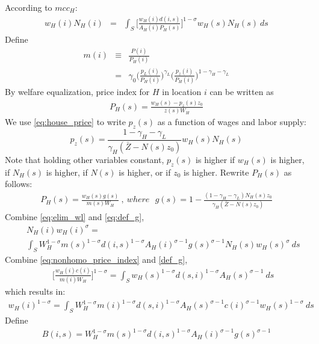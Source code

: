 \documentclass{article}
\begin{document}
According to $mcc_H$:
\begin{eqnarray}
    \label{eq:elim_wl}
	w_H(i) N_H(i) & = & \int_S \Big[ \frac{w_H(i) d(i,s)}{A_H(i) P_H(s)} \Big]^{1-\sigma} w_H(s) N_H(s) ~ds
\end{eqnarray}
Define
\begin{eqnarray}
    \label{eq:def_m}
	m(i)  & \equiv & \frac{P(i)}{P_H(i)} \nonumber \\ & = & 
	\gamma_{0}
	\Big( \frac{p_L(i)}{P_H(i)} \Big)^{\gamma_L}
	\Big( \frac{p_z(i)}{P_H(i)} \Big)^{1-\gamma_H-\gamma_L}
\end{eqnarray}
By welfare equalization, price index for $H$ in location $i$ can be written as
\begin{eqnarray}
	P_H(s) = \frac{w_H(s) -p_z(s)z_0}{z(s) W_H } \nonumber
\end{eqnarray}
We use \eqref{eq:house_price} to write $p_z(s)$ as a function of wages and labor supply: 
\[
	p_z(s) = \frac{1-\gamma_H -\gamma_L}{\gamma_H (\bar{Z}-N(s)z_0)}w_H(s)N_H(s)
\]
Note that holding other variables constant, $p_z(s)$ is higher if $w_H(s)$ is higher, if $N_H(s)$ is higher, if $N(s)$ is higher, or if $z_0$ is higher. Rewrite $P_H(s)$ as follows:
\begin{eqnarray}
	P_H(s) = \frac{w_H(s)g(s)}{m(s) W_H }	~,~where~~~
    \label{eq:def_g}
	g(s)=1- \frac{(1-\gamma_H -\gamma_L)N_H(s)z_0}{\gamma_H (\bar{Z}-N(s)z_0)} 
\end{eqnarray}
Combine \eqref{eq:elim_wl} and \eqref{eq:def_g},
\begin{eqnarray}
	& & N_H(i) w_H(i)^{\sigma}   = \nonumber \\
	& & \int_S W_H^{1-\sigma} m(s)^{1-\sigma} d(i,s)^{1-\sigma} A_H(i)^{\sigma-1} g(s)^{\sigma-1} N_H(s) w_H(s)^{\sigma}~ds  \nonumber
\end{eqnarray}
Combine \eqref{eq:nonhomo_price_index} and \eqref{def_g}, 
\begin{eqnarray}
    \label{eq:nonhomo_append_eq1}
	& & \Big[ \frac{w_H(i) c(i)}{m(i) W_H } \Big]^{1-\sigma} = \int_S w_H(s)^{1-\sigma}d(s,i)^{1-\sigma}A_H(s)^{\sigma-1}~ ds
\end{eqnarray}
which results in:
\begin{eqnarray}
    \label{eq:nonhomo_append_eq2}
 	w_H(i)^{1-\sigma} = \int_S W_H^{1-\sigma} m(i)^{1-\sigma} d(s,i)^{1-\sigma} A_H(s)^{\sigma-1} c(i)^{\sigma-1}  	w_H(s)^{1-\sigma}
 	~ ds
\end{eqnarray}
Define
\begin{eqnarray}
    \label{eq:def_B}
	B(i,s) = W_H^{1-\sigma} m(s)^{1-\sigma}  d(i,s)^{1-\sigma} A_H(i)^{\sigma-1} g(s)^{\sigma-1} \nonumber
\end{eqnarray}
\end{document}

